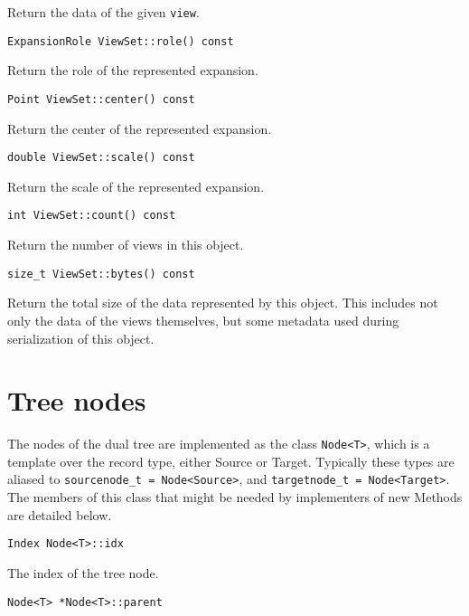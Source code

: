 Return the data of the given \texttt{view}.

\begin{lstlisting}
ExpansionRole ViewSet::role() const
\end{lstlisting}


Return the role of the represented expansion.

\begin{lstlisting}
Point ViewSet::center() const
\end{lstlisting}


Return the center of the represented expansion.

\begin{lstlisting}
double ViewSet::scale() const
\end{lstlisting}


Return the scale of the represented expansion.

\begin{lstlisting}
int ViewSet::count() const
\end{lstlisting}


Return the number of views in this object.

\begin{lstlisting}
size_t ViewSet::bytes() const
\end{lstlisting}


Return the total size of the data represented by this object. This includes
not only the data of the views themselves, but some metadata used during
serialization of this object.


\section{Tree nodes}

The nodes of the dual tree are implemented as the class \texttt{Node<T>}, which
is a template over the record type, either Source or Target. Typically these
types are aliased to \texttt{sourcenode\_t = Node<Source>}, and
\texttt{targetnode\_t = Node<Target>}. The members of this class that might be
needed by implementers of new Methods are detailed below.

\begin{lstlisting}
Index Node<T>::idx
\end{lstlisting}


The index of the tree node.

\begin{lstlisting}
Node<T> *Node<T>::parent
\end{lstlisting}


